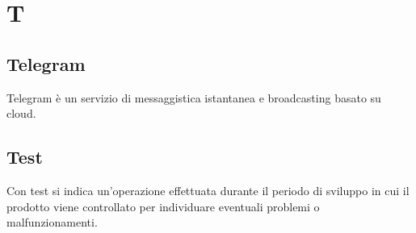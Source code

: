 \section{T}
	\subsection{Telegram}  
		Telegram è un servizio di messaggistica istantanea e broadcasting basato su cloud.
	\subsection{Test}  
		Con test si indica un'operazione effettuata durante il periodo di sviluppo in cui il prodotto viene controllato per individuare eventuali problemi o malfunzionamenti.
	
\newpage